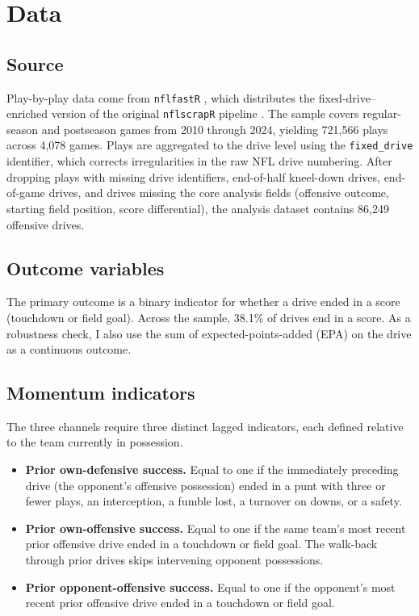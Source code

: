 \documentclass[11pt]{article}
\begin{document}
\section{Data}\label{sec:data}

\subsection{Source}

Play-by-play data come from \texttt{nflfastR} \citep{nflfastr2024}, which
distributes the fixed-drive--enriched version of the original
\texttt{nflscrapR} pipeline \citep{yurko2018nflwar}. The sample covers
regular-season and postseason games from 2010 through 2024, yielding 721{,}566
plays across 4{,}078 games. Plays are aggregated to the drive level using the
\texttt{fixed\_drive} identifier, which corrects irregularities in the raw
NFL drive numbering. After dropping plays with missing drive identifiers,
end-of-half kneel-down drives, end-of-game drives, and drives missing the
core analysis fields (offensive outcome, starting field position, score
differential), the analysis dataset contains 86{,}249 offensive drives.

\subsection{Outcome variables}

The primary outcome is a binary indicator for whether a drive ended in a
score (touchdown or field goal). Across the sample, 38.1\% of drives end in
a score. As a robustness check, I also use the sum of expected-points-added
(EPA) on the drive as a continuous outcome.

\subsection{Momentum indicators}

The three channels require three distinct lagged indicators, each defined
relative to the team currently in possession.

\begin{itemize}
    \item \textbf{Prior own-defensive success.} Equal to one if the
    immediately preceding drive (the opponent's offensive possession) ended in
    a punt with three or fewer plays, an interception, a fumble lost, a
    turnover on downs, or a safety.
    \item \textbf{Prior own-offensive success.} Equal to one if the same
    team's most recent prior offensive drive ended in a touchdown or field
    goal. The walk-back through prior drives skips intervening opponent
    possessions.
    \item \textbf{Prior opponent-offensive success.} Equal to one if the
    opponent's most recent prior offensive drive ended in a touchdown or field
    goal.
\end{itemize}
\end{document}
